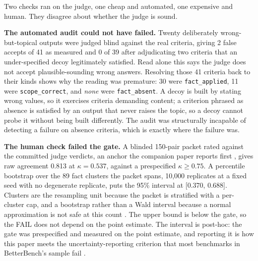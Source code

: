 \documentclass[11pt]{article}
\newcommand{\code}[1]{\texttt{\small #1}}
\begin{document}
Two checks ran on the judge, one cheap and automated, one expensive and human.
They disagree about whether the judge is sound.

\textbf{The automated audit could not have failed.} Twenty deliberately
wrong-but-topical outputs were judged blind against the real criteria, giving
2 false accepts of 41 as measured and 0 of 39 after adjudicating two criteria
that an under-specified decoy legitimately satisfied. Read alone this says the
judge does not accept plausible-sounding wrong answers. Resolving those 41
criteria back to their kinds shows why the reading was premature: 30 were
\code{fact\_applied}, 11 were \code{scope\_correct}, and \emph{none} were
\code{fact\_absent}. A decoy is built by stating wrong values, so it exercises
criteria demanding content; a criterion phrased as absence is satisfied by an
output that never raises the topic, so a decoy cannot probe it without being
built differently. The audit was structurally incapable of detecting a failure
on absence criteria, which is exactly where the failure was.

\textbf{The human check failed the gate.} A blinded 150-pair packet rated
against the committed judge verdicts, an anchor the companion paper reports
first \cite{companion}, gives raw agreement 0.813 at $\kappa = 0.537$, against
a prespecified $\kappa \geq 0.75$. A percentile bootstrap over the 89 fact
clusters the packet spans, 10,000 replicates at a fixed seed with no
degenerate replicate, puts the 95\% interval at [0.370, 0.688]. Clusters are
the resampling unit because the packet is stratified with a per-cluster cap,
and a bootstrap rather than a Wald interval because a normal approximation is
not safe at this count \cite{bowyer, miller}. The upper bound is below the
gate, so the FAIL does not depend on the point estimate. The interval is
post-hoc: the gate was prespecified and measured on the point estimate, and
reporting it is how this paper meets the uncertainty-reporting criterion that
most benchmarks in BetterBench's sample fail \cite{betterbench}.
\end{document}
